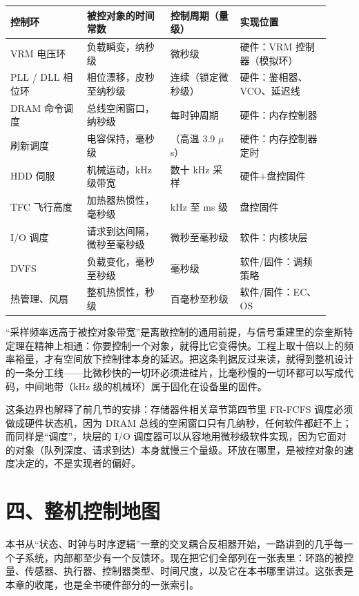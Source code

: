 \begin{longtable}{L{0.22\linewidth}L{0.24\linewidth}L{0.20\linewidth}L{0.26\linewidth}}
\toprule
控制环 & 被控对象的时间常数 & 控制周期（量级） & 实现位置 \\
\midrule
VRM 电压环 & 负载瞬变，纳秒级 & 微秒级 & 硬件：VRM 控制器（模拟环） \\\tablerowrule
PLL / DLL 相位环 & 相位漂移，皮秒至纳秒级 & 连续（锁定微秒级） & 硬件：鉴相器、VCO、延迟线 \\\tablerowrule
DRAM 命令调度 & 总线空闲窗口，纳秒级 & 每时钟周期 & 硬件：内存控制器 \\\tablerowrule
刷新调度 & 电容保持，毫秒级 & （高温 3.9 $\mu$s） & 硬件：内存控制器定时 \\\tablerowrule
HDD 伺服 & 机械运动，kHz 级带宽 & 数十 kHz 采样 & 硬件+盘控固件 \\\tablerowrule
TFC 飞行高度 & 加热器热惯性，毫秒级 & kHz 至 ms 级 & 盘控固件 \\\tablerowrule
I/O 调度 & 请求到达间隔，微秒至毫秒级 & 微秒至毫秒级 & 软件：内核块层 \\\tablerowrule
DVFS & 负载变化，毫秒至秒级 & 毫秒级 & 软件/固件：调频策略 \\\tablerowrule
热管理、风扇 & 整机热惯性，秒级 & 百毫秒至秒级 & 软件/固件：EC、OS \\
\bottomrule
\end{longtable}

\begin{classicnote}
“采样频率远高于被控对象带宽”是离散控制的通用前提，与信号重建里的奈奎斯特定理在精神上相通：你要控制一个对象，就得比它变得快。工程上取十倍以上的频率裕量，才有空间放下控制律本身的延迟。把这条判据反过来读，就得到整机设计的一条分工线——比微秒快的一切环必须进硅片，比毫秒慢的一切环都可以写成代码，中间地带（kHz 级的机械环）属于固化在设备里的固件。
\end{classicnote}

这条边界也解释了前几节的安排：存储器件相关章节第四节里 FR-FCFS 调度必须做成硬件状态机，因为 DRAM 总线的空闲窗口只有几纳秒，任何软件都赶不上；而同样是“调度”，块层的 I/O 调度器可以从容地用微秒级软件实现，因为它面对的对象（队列深度、请求到达）本身就慢三个量级。环放在哪里，是被控对象的速度决定的，不是实现者的偏好。

\section{四、整机控制地图}

本书从“状态、时钟与时序逻辑”一章的交叉耦合反相器开始，一路讲到的几乎每一个子系统，内部都至少有一个反馈环。现在把它们全部列在一张表里：环路的被控量、传感器、执行器、控制器类型、时间尺度，以及它在本书哪里讲过。这张表是本章的收尾，也是全书硬件部分的一张索引。

